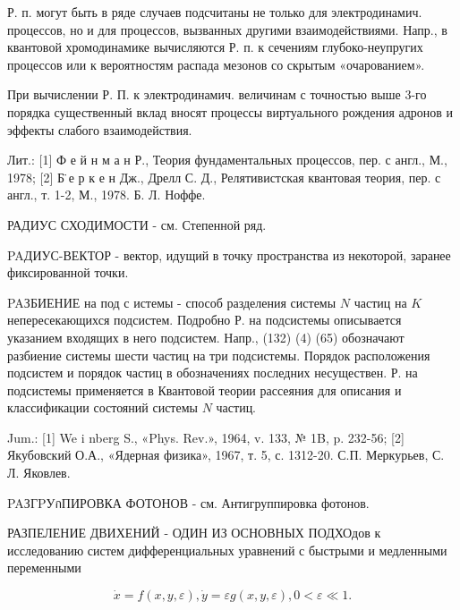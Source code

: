 \documentclass[10pt]{article}
\begin{document}
Р. п. могут быть в ряде случаев подсчитаны не только для электродинамич. процессов, но и для процессов, вызванных другими взаимодействиями. Напр., в квантовой хромодинамике вычисляются Р. п. к сечениям глубоко-неупругих процессов или к вероятностям распада мезонов со скрытым «очарованием».



При вычислении Р. П. к электродинамич. величинам с точностью выше 3-го порядка существенный вклад вносят процессы виртуального рождения адронов и эффекты слабого взаимодействия.



Лит.: [1] Ф е й н м а н Р., Теория фундаментальных процессов, пер. с англ., М., 1978; [2] Б̈ е р к е н Дж., Дрелл С. Д., Релятивистская квантовая теория, пер. с англ., т. 1-2, М., 1978. Б. Л. Ноффе.



РАДИУС СХОДИМОСТИ - см. Степенной ряд.



PAДИУС-ВЕКТОР - вектор, идущий в точку пространства из некоторой, заранее фиксированной точки.



PAЗБИЕНИЕ на под с истемы - способ разделения системы $N$ частиц на $K$ непересекающихся подсистем. Подробно Р. на подсистемы описывается указанием входящих в него подсистем. Напр., (132) (4) (65) обозначают разбиение системы шести частиц на три подсистемы. Порядок расположения подсистем и порядок частиц в обозначениях последних несуществен. Р. на подсистемы применяется в Квантовой теории рассеяния для описания и классификации состояний системы $N$ частиц.



Jum.: [1] We i nberg S., «Phys. Rev.», 1964, v. 133, № 1B, p. 232-56; [2] Якубовский О.А., «Ядерная физика», 1967, т. 5, с. 1312-20. С.П. Меркурьев, С. Л. Яковлев.



PAЗГPУกПИРОВКА ФОТОНОВ - см. Антигруппировка фотонов.



РАЗПЕЛЕНИЕ ДВИХЕНИЙ - ОДИН ИЗ ОСНОВНЫХ ПОДХОдов к исследованию систем дифференциальных уравнений с быстрыми и медленными переменными



\[

\dot{x}=f(x, y, \varepsilon), \dot{y}=\varepsilon g(x, y, \varepsilon), 0<\varepsilon \ll 1 .

\]
\end{document}
